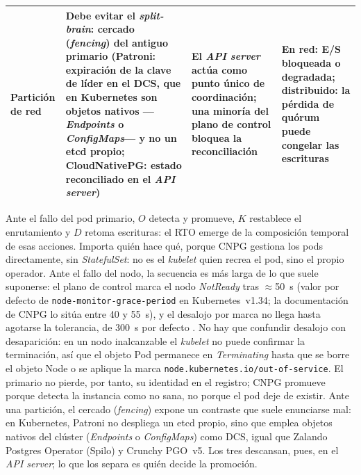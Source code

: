 \begin{table}[t]
\begin{tabularx}{\linewidth}{@{}>{\raggedright\arraybackslash}p{2.4cm} >{\raggedright\arraybackslash}X >{\raggedright\arraybackslash}X >{\raggedright\arraybackslash}X@{}}
Partición de red &
Debe evitar el \textit{split-brain}: cercado (\textit{fencing}) del antiguo primario (Patroni: expiración de la clave de líder en el DCS, que en Kubernetes son objetos nativos —\textit{Endpoints} o \textit{ConfigMaps}— y no un etcd propio; CloudNativePG: estado reconciliado en el \textit{API server}) &
El \textit{API server} actúa como punto único de coordinación; una minoría del plano de control bloquea la reconciliación &
En red: E/S bloqueada o degradada; distribuido: la pérdida de quórum puede congelar las escrituras \\
\bottomrule
\end{tabularx}
\end{table}



Ante el fallo del pod primario, $O$ detecta y promueve, $K$ restablece el enrutamiento y $D$ retoma escrituras: el RTO emerge de la composición temporal de esas acciones. Importa quién hace qué, porque CNPG gestiona los pods directamente, sin \textit{StatefulSet}: no es el \textit{kubelet} quien recrea el pod, sino el propio operador. Ante el fallo del nodo, la secuencia es más larga de lo que suele suponerse: el plano de control marca el nodo \textit{NotReady} tras $\approx$50~s  (valor por defecto de \texttt{node-monitor-grace-period} en Kubernetes~v1.34; la documentación de CNPG lo sitúa entre 40 y 55~s), y el desalojo por marca no llega hasta agotarse la tolerancia, de 300~s por defecto \citep{k8s2026kcm}. No hay que confundir desalojo con desaparición: en un nodo inalcanzable el \textit{kubelet} no puede confirmar la terminación, así que el objeto Pod permanece en \textit{Terminating} hasta que se borre el objeto Node o se aplique la marca \texttt{node.kubernetes.io/\allowbreak out-of-\allowbreak service}. El primario no pierde, por tanto, su identidad en el registro; CNPG promueve porque detecta la instancia como no sana, no porque el pod deje de existir. Ante una partición, el cercado (\textit{fencing}) expone un contraste que suele enunciarse mal: en Kubernetes, Patroni no despliega un etcd propio, sino que emplea objetos nativos del clúster  (\textit{Endpoints} o \textit{ConfigMaps}) como DCS, igual que Zalando Postgres Operator (Spilo) y Crunchy PGO~v5. Los tres descansan, pues, en el \textit{API server}; lo que los separa es quién decide la promoción.


